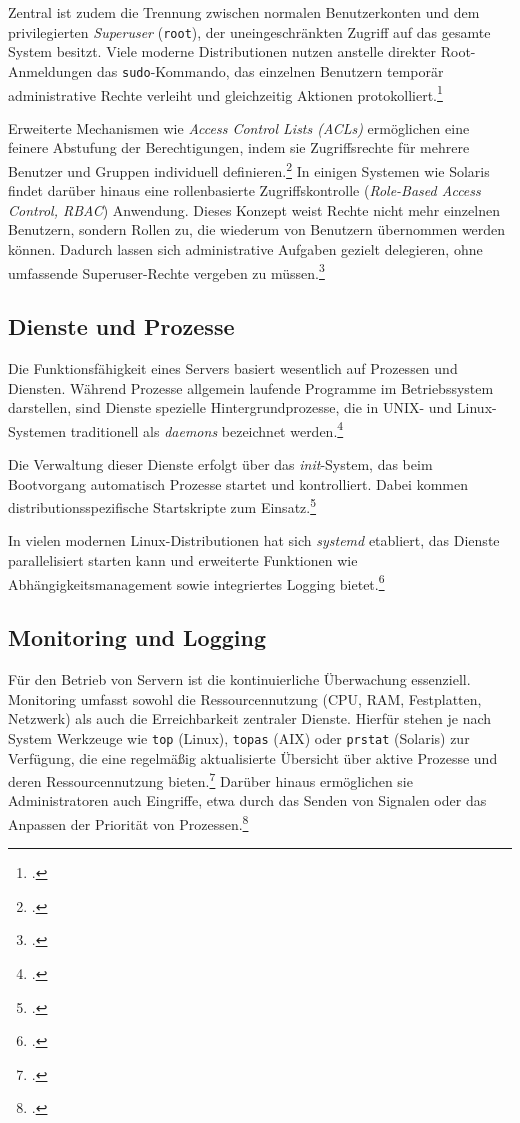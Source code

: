\documentclass[12pt,a4paper]{report}
\begin{document}
  Zentral ist zudem die Trennung zwischen normalen Benutzerkonten und dem privilegierten \emph{Superuser} (\texttt{root}), 
  der uneingeschränkten Zugriff auf das gesamte System besitzt. 
  Viele moderne Distributionen nutzen anstelle direkter Root-Anmeldungen das \texttt{sudo}-Kommando, 
  das einzelnen Benutzern temporär administrative Rechte verleiht und gleichzeitig Aktionen protokolliert.\footcite[Vgl.][S.~112~ff.]{nemeth_unixlinux}

  Erweiterte Mechanismen wie \emph{Access Control Lists (ACLs)} ermöglichen eine feinere Abstufung der Berechtigungen, 
  indem sie Zugriffsrechte für mehrere Benutzer und Gruppen individuell definieren.\footcite[Vgl.][S.~159~ff.]{nemeth_unixlinux} 
  In einigen Systemen wie Solaris findet darüber hinaus eine rollenbasierte Zugriffskontrolle (\emph{Role-Based Access Control, RBAC}) Anwendung. 
  Dieses Konzept weist Rechte nicht mehr einzelnen Benutzern, sondern Rollen zu, die wiederum von Benutzern übernommen werden können. 
  Dadurch lassen sich administrative Aufgaben gezielt delegieren, ohne umfassende Superuser-Rechte vergeben zu müssen.\footcite[Vgl.][S.~108]{nemeth_unixlinux}

  \subsection{Dienste und Prozesse}
  Die Funktionsfähigkeit eines Servers basiert wesentlich auf Prozessen und Diensten. 
  Während Prozesse allgemein laufende Programme im Betriebssystem darstellen, 
  sind Dienste spezielle Hintergrundprozesse, die in UNIX- und Linux-Systemen 
  traditionell als \emph{daemons} bezeichnet werden.\footcite[Vgl.]{wikipedia_daemon}  

  Die Verwaltung dieser Dienste erfolgt über das \emph{init}-System, 
  das beim Bootvorgang automatisch Prozesse startet und kontrolliert. 
  Dabei kommen distributionsspezifische Startskripte zum Einsatz.\footcite[Vgl.][S.~88~ff.]{nemeth_unixlinux}  

  In vielen modernen Linux-Distributionen hat sich \emph{systemd} etabliert, 
  das Dienste parallelisiert starten kann und erweiterte Funktionen wie Abhängigkeitsmanagement 
  sowie integriertes Logging bietet.\footcite[Vgl.]{wikipedia_systemd}   

  \subsection{Monitoring und Logging}
  Für den Betrieb von Servern ist die kontinuierliche Überwachung essenziell. 
  Monitoring umfasst sowohl die Ressourcennutzung (CPU, RAM, Festplatten, Netzwerk) als auch die Erreichbarkeit zentraler Dienste. 
  Hierfür stehen je nach System Werkzeuge wie \texttt{top} (Linux), \texttt{topas} (AIX) oder \texttt{prstat} (Solaris) zur Verfügung, 
  die eine regelmäßig aktualisierte Übersicht über aktive Prozesse und deren Ressourcennutzung bieten.\footcite[Vgl.][S.~133]{nemeth_unixlinux}
  Darüber hinaus ermöglichen sie Administratoren auch Eingriffe, 
  etwa durch das Senden von Signalen oder das Anpassen der Priorität von Prozessen.\footcite[Vgl.][S.~134]{nemeth_unixlinux}
\end{document}
